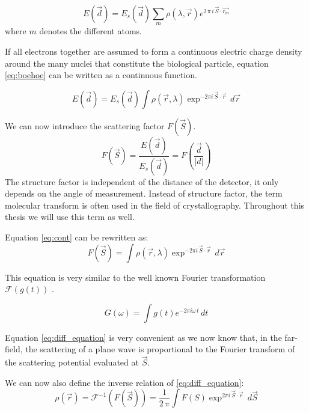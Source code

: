 \begin{equation}\label{eq:boehoe2}
E(\vec{d}) = E_s(\vec{d}) \sum_{m} \rho(\lambda,\vec{r}) e^{2\,\pi\,  i\,\vec{S}\cdot\vec{r_m}}
\end{equation}
where $m$ denotes the different atoms.

If all electrons together are assumed to form a continuous electric charge density around the many nuclei that constitute the biological particle, equation \ref{eq:boehoe}  can be written as a continuous function. 

\begin{equation}\label{eq:cont}
E(\vec{d}) = E_s(\vec{d})\int \rho(\vec{r},\lambda) \exp^{-2\pi i \,\vec{S} \cdot \vec{r}}\,d\vec{r}
\end{equation}

We can now introduce the scattering factor $F(\vec{S})$.
\begin{equation}
F\left(\vec{S}\right) = \frac{E(\vec{d})}{E_s(\vec{d})} = F\left(\frac{\vec{d}}{|d|}\right)
\end{equation}
The structure factor is independent of the distance of the detector, it only depends on the angle of measurement. Instead of structure factor, the term molecular transform is often used in the field of crystallography. Throughout this thesis we will use this term as well.

Equation \ref{eq:cont} can be rewritten as:
\begin{equation}\label{eq:diff_equation}
F(\vec{S}) = \int \rho(\vec{r},\lambda) \exp^{-2\pi i \,\vec{S} \cdot \vec{r}}\,d\vec{r}
\end{equation}

This equation is very similar to the well known Fourier transformation $\mathcal{F}( g( t ) )$ \cite{Vretblad2003}. 

\begin{equation}
 G(\omega) = \int g(t) e^{-2 \pi i \omega\, t}\,dt
\end{equation}

Equation \ref{eq:diff_equation} is very convenient as we now know that, in the far-field, the scattering of a plane wave is proportional to the Fourier transform of the scattering potential evaluated at $\vec{S}$.

We can now also define the inverse relation of \ref{eq:diff_equation}:
\begin{equation}\label{eq:inverse}
\rho(\vec{r}) = \mathcal{F}^{-1} ( F(\vec{S}) ) = \frac{1}{2\,\pi}\int F(S) \exp^{2\pi i \,\vec{S} \cdot \vec{r}}\,d\vec{S}
\end{equation}


